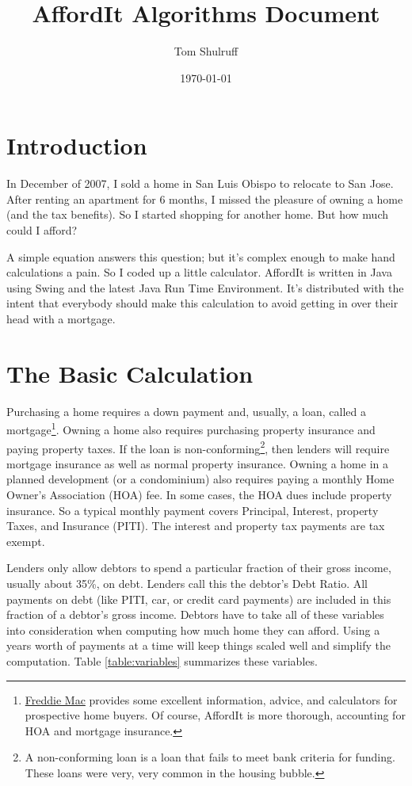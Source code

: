 \documentclass{article}
\title{AffordIt Algorithms Document}
\author{Tom Shulruff}
\date{\today}
\begin{document}
\maketitle

\section{Introduction}

In December of 2007, I sold a home in San Luis Obispo to relocate
to San Jose.  After renting an apartment for 6 months, I missed
the pleasure of owning a home (and the tax benefits).  So I started
shopping for another home.  But how much could I afford?

A simple equation answers this question; but it's complex
enough to make hand calculations a pain.  So I coded up a little
calculator. AffordIt is written in Java using Swing and the latest Java Run Time
Environment.  It's distributed with the intent that everybody 
should make this calculation to avoid getting in over their head with
a mortgage.

\section{The Basic Calculation}

Purchasing a home requires a down payment and, usually, a loan,
called a mortgage\footnote{
\href{http://www.freddiemac.com/corporate/buying_and_owning.html}{Freddie Mac} 
provides some excellent information, advice, and calculators  for prospective home buyers.
Of course, AffordIt is more thorough, accounting for HOA and mortgage insurance.}.
Owning a home also requires purchasing property insurance 
and paying property taxes.  
If the loan is non-conforming\footnote{
A non-conforming loan is a loan that fails to meet bank criteria for funding.
These loans were very, very common in the housing bubble.},
then lenders will require mortgage insurance as well as normal
property insurance.
Owning a home
in a planned development (or a condominium) also requires paying
a monthly Home Owner's Association (HOA) fee. In some cases, the HOA dues include
property insurance.
So a typical monthly payment covers 
Principal, Interest, property Taxes, and Insurance (PITI).  
The interest and property tax payments are tax exempt.  

Lenders only allow debtors to spend a particular fraction of their
 gross income, usually about 35\%, on debt.
Lenders call this the debtor's Debt Ratio. All 
payments on debt (like PITI, car, or credit card payments) are
included in this fraction of a debtor's gross income.
Debtors have to take all of these variables into consideration when computing how much
 home they can afford. 
Using a years worth of 
payments at a time will keep things scaled well and simplify the computation.
Table \ref{table:variables} summarizes these variables.
\end{document}
